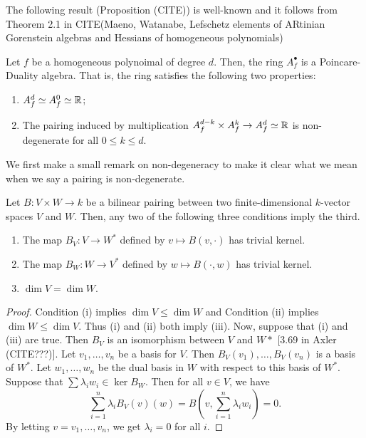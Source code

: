 \documentclass{puthesis-UG}
\begin{document}
The following result (Proposition (CITE)) is well-known and it follows from Theorem 2.1 in CITE(Maeno, Watanabe, Lefschetz elements of ARtinian Gorenstein algebras and Hessians of homogeneous polynomials)
\begin{prop} \label{chow-ring-is-a-PD-algebra}
	Let $f$ be a homogeneous polynoimal of degree $d$. Then, the ring $A_f^\bullet$ is a Poincare-Duality algebra. That is, the ring satisfies the following two properties:
	\begin{enumerate}[label = (\alph*)]
		\item $A_f^d \simeq A_f^0 \simeq \mathbb{R}$;

		\item The pairing induced by multiplication $A_f^{d-k} \times A_f^k \to A_f^d \simeq \mathbb{R}$ is non-degenerate for all $0 \leq k \leq d$. 
	\end{enumerate}
\end{prop}

We first make a small remark on non-degeneracy to make it clear what we mean when we say a pairing is non-degenerate. 
\begin{lem} \label{non-degeneracy-definition}
	Let $B : V \times W \to k$ be a bilinear pairing between two finite-dimensional $k$-vector spaces $V$ and $W$. Then, any two of the following three conditions imply the third. 
		\begin{enumerate}[label = (\roman*)]
			\item The map $B_V : V \to W^*$ defined by $v \mapsto B(v, \cdot)$ has trivial kernel.
			\item The map $B_W : W \to V^*$ defined by $w \mapsto B(\cdot, w)$ has trivial kernel. 
			\item $\dim V = \dim W$. 
		\end{enumerate}
	\end{lem}

	\begin{proof}
		Condition (i) implies $\dim V \leq \dim W$ and Condition (ii) implies $\dim W \leq \dim V$. Thus (i) and (ii) both imply (iii). Now, suppose that (i) and (iii) are true. Then $B_V$ is an isomorphism between $V$ and $W*$ [3.69 in Axler (CITE???)]. Let $v_1, \ldots, v_n$ be a basis for $V$. Then $B_V(v_1), \ldots, B_V(v_n)$ is a basis of $W^*$. Let $w_1, \ldots, w_n$ be the dual basis in $W$ with respect to this basis of $W^*$. Suppose that $\sum \lambda_i w_i \in \ker B_W$. Then for all $v \in V$, we have 
		\[
			\sum_{i = 1}^n \lambda_i B_V(v)(w) = B \left ( v, \sum_{i = 1}^n \lambda_i w_i \right ) = 0. 
		\]
		By letting $v = v_1, \ldots, v_n$, we get $\lambda_i = 0$ for all $i$. 
	\end{proof}
\end{document}
